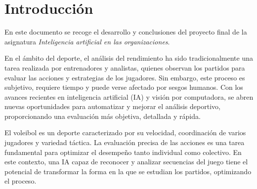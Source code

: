 \documentclass[12pt]{report} %
\begin{document}
\newpage %
\thispagestyle{empty}
\mbox{}


\tableofcontents
\thispagestyle{fancy}

\newpage %
\thispagestyle{empty}
\mbox{}

 \listoffigures
 \thispagestyle{fancy}

 \newpage %
 \thispagestyle{empty}
 \mbox{}

\listoftables
 \thispagestyle{fancy}

 \newpage %
 \thispagestyle{empty}
 \mbox{}


\clearpage
{} %

    \chapter{Introducción}
    \label{chap:intro}

    En este documento se recoge el desarrollo y conclusiones del proyecto final
    de la asignatura \textit{Inteligencia artificial en las organizaciones}.

    En el ámbito del deporte, el análisis del rendimiento ha sido
    tradicionalmente una tarea realizada por entrenadores y analistas, quienes
    observan los partidos para evaluar las acciones y estrategias de los
    jugadores. Sin embargo, este proceso es subjetivo, requiere tiempo y puede
    verse afectado por sesgos humanos. Con los avances recientes en
    inteligencia artificial (IA) y visión por computadora, se abren nuevas
    oportunidades para automatizar y mejorar el análisis deportivo,
    proporcionando una evaluación más objetiva, detallada y rápida.

    El voleibol es un deporte caracterizado por su velocidad, coordinación de
    varios jugadores y variedad táctica. La evaluación precisa de las acciones
    es una tarea fundamental para optimizar el desempeño tanto individual como
    colectivo. En este contexto, una IA capaz de reconocer y analizar
    secuencias del juego tiene el potencial de transformar la forma en la que
    se estudian los partidos, optimizando el proceso. 
\end{document}
